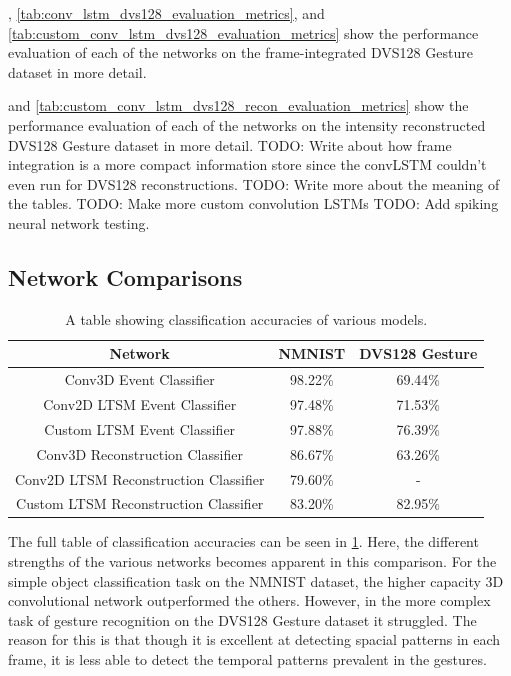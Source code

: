 , \cref{tab:conv_lstm_dvs128_evaluation_metrics}, and \cref{tab:custom_conv_lstm_dvs128_evaluation_metrics} show the performance evaluation of each of the networks on the frame-integrated DVS128 Gesture dataset in more detail.

 and \cref{tab:custom_conv_lstm_dvs128_recon_evaluation_metrics} show the performance evaluation of each of the networks on the intensity reconstructed DVS128 Gesture dataset in more detail. 
\color {red} TODO: Write about how frame integration is a more compact information store since the convLSTM couldn't even run for DVS128 reconstructions. \color{black}
\color{red} TODO: Write more about the meaning of the tables. \color{black}
\color{red} TODO: Make more custom convolution LSTMs \color{black}
\color{red} TODO: Add spiking neural network testing. \color{black}

\subsection{Network Comparisons}

\begin{table}[htb]
    \centering
    \begin{tabular}{|| c | c | c ||}
        \hline
        Network     & NMNIST & DVS128 Gesture \\
        \hline \hline
        Conv3D Event Classifier          & 98.22\%   &   69.44\%    \\
        \hline
        Conv2D LTSM Event Classifier         & 97.48\%   &    71.53\%    \\
        \hline
        Custom LTSM Event Classifier         & 97.88\%  &   76.39\%     \\
        \hline
        Conv3D Reconstruction Classifier           & 86.67\%    &   63.26\%    \\
        \hline
        Conv2D LTSM Reconstruction Classifier          & 79.60\%   &  -    \\
        \hline
        Custom LTSM Reconstruction Classifier         & 83.20\%  &   82.95\%   \\
        \hline
    \end{tabular}
    \caption{A table showing classification accuracies of various models.}
    \label{tab:network_performances}
\end{table}

The full table of classification accuracies can be seen in \cref{tab:network_performances}. Here, the different strengths of the various networks becomes apparent in this comparison. For the simple object classification task on the NMNIST dataset, the higher capacity 3D convolutional network outperformed the others. However, in the more complex task of gesture recognition on the DVS128 Gesture dataset it struggled. The reason for this is that though it is excellent at detecting spacial patterns in each frame, it is less able to detect the temporal patterns prevalent in the gestures.

